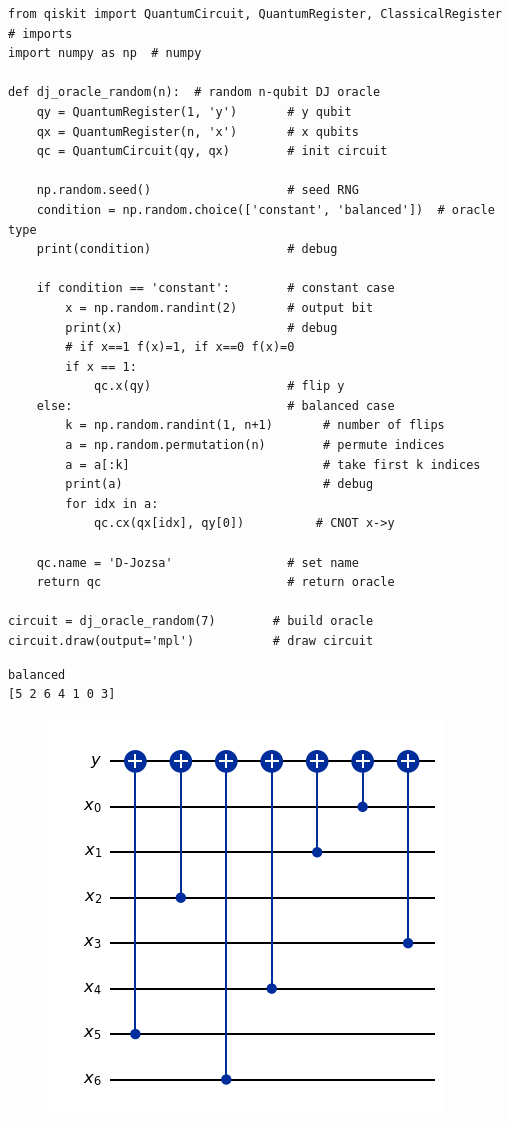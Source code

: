 \newpage
\begin{lstlisting}[style=python]
from qiskit import QuantumCircuit, QuantumRegister, ClassicalRegister  # imports
import numpy as np  # numpy

def dj_oracle_random(n):  # random n-qubit DJ oracle
	qy = QuantumRegister(1, 'y')       # y qubit
	qx = QuantumRegister(n, 'x')       # x qubits
	qc = QuantumCircuit(qy, qx)        # init circuit
	
	np.random.seed()                   # seed RNG
	condition = np.random.choice(['constant', 'balanced'])  # oracle type
	print(condition)                   # debug
	
	if condition == 'constant':        # constant case
		x = np.random.randint(2)       # output bit
		print(x)                       # debug
		# if x==1 f(x)=1, if x==0 f(x)=0
		if x == 1:
			qc.x(qy)                   # flip y
	else:                              # balanced case
		k = np.random.randint(1, n+1)       # number of flips
		a = np.random.permutation(n)        # permute indices
		a = a[:k]                           # take first k indices
		print(a)                            # debug
		for idx in a:
			qc.cx(qx[idx], qy[0])          # CNOT x->y
	
	qc.name = 'D-Jozsa'                # set name
	return qc                          # return oracle

circuit = dj_oracle_random(7)        # build oracle
circuit.draw(output='mpl')           # draw circuit
\end{lstlisting}
\begin{lstlisting}
balanced
[5 2 6 4 1 0 3]
\end{lstlisting}

\begin{figure}[h!]\centering
\includegraphics[scale=.5]{images/lab04_1}
\end{figure}

